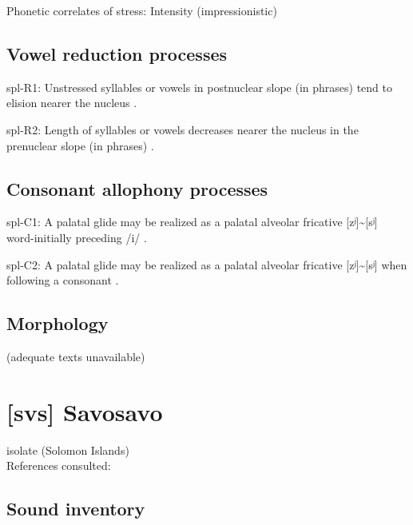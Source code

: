{\begin{appendixdesc}
\item[Phonetic correlates of stress:] Intensity (impressionistic)
\end{appendixdesc}
\subsection*{Vowel reduction processes}
\begin{appendixdesc}

\item[spl-R1:] Unstressed syllables or vowels in postnuclear slope (in phrases) tend to elision nearer the nucleus \citep[6]{McElhanon1970}.

\item[spl-R2:] Length of syllables or vowels decreases nearer the nucleus in the prenuclear slope (in phrases) \citep[6]{McElhanon1970}.
\end{appendixdesc}
\subsection*{Consonant allophony processes}
\begin{appendixdesc}

\item[spl-C1:] A palatal glide may be realized as a palatal alveolar fricative [zʲ]{\textasciitilde}[sʲ] word-initially preceding /i/ \citep{McElhanon1970}.

\item[spl-C2:] A palatal glide may be realized as a palatal alveolar fricative [zʲ]{\textasciitilde}[sʲ] when following a consonant \citep{McElhanon1970}.
\end{appendixdesc}
\subsection*{Morphology}

(adequate texts unavailable)

\newpage\section*{[svs] Savosavo} %
isolate (Solomon Islands)\medskip\\
References consulted: \citet{Wegener2008}

\subsection*{Sound inventory}
\begin{appendixdesc}


\end{appendixdesc}}
